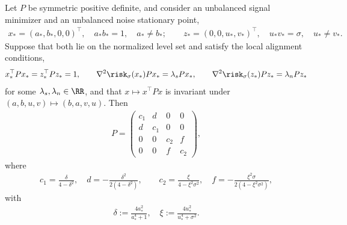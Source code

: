 \documentclass{article}
\begin{document}
\begin{proposition}
\label{prop:diag1sigma_structure}
Let $P$ be symmetric positive definite, and consider an unbalanced signal
minimizer and an unbalanced noise stationary point,
\begin{align}
    x_*=(a_*,b_*,0,0)^\top,
    \quad a_*b_*=1,
    \quad a_*\ne b_*;
    \qquad
    z_*=(0,0,u_*,v_*)^\top,
    \quad u_*v_*=\sigma,
    \quad u_*\ne v_*.
\end{align}
Suppose that both lie on the normalized level set and satisfy the local
alignment conditions,
\begin{align}
    x_*^\top P x_*=z_*^\top Pz_*=1,
    \qquad
    \nabla^2\risk_\sigma(x_*)Px_*=\lambda_s Px_*,
    \qquad
    \nabla^2\risk_\sigma(z_*)Pz_*=\lambda_n Pz_*
\end{align}
for some $\lambda_s,\lambda_n\in\RR$, and that $x\mapsto x^\top P x$ is
invariant under $(a,b,u,v)\mapsto (b,a,v,u)$. Then
\begin{align}
    P=
    \begin{pmatrix}
        c_1 & d   & 0   & 0\\
        d   & c_1 & 0   & 0\\
        0   & 0   & c_2 & f\\
        0   & 0   & f   & c_2
    \end{pmatrix},
\end{align}
where
\begin{align}
    c_1=\frac{\delta}{4-\delta^2},
    \quad
    d=-\frac{\delta^2}{2(4-\delta^2)},
    \qquad
    c_2=\frac{\xi}{4-\xi^2\sigma^2},
    \quad
    f=-\frac{\xi^2\sigma}{2(4-\xi^2\sigma^2)},
\end{align}
with
\begin{align}
    \delta := \frac{4a_*^2}{a_*^4+1},
    \quad
    \xi := \frac{4u_*^2}{u_*^4+\sigma^2}.
\end{align}
\end{proposition}
\end{document}

